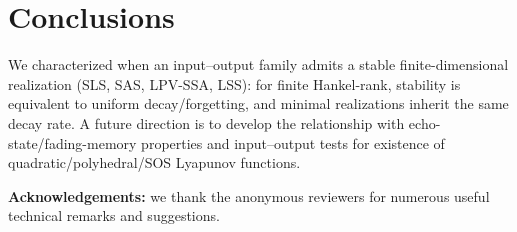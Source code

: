 \documentclass[journal,twoside,web]{ieeecolor}
\newtheorem{corollary}[Theorem]{Corollary}
\begin{document}


\section{Conclusions}
We characterized when an input--output family admits a stable finite-dimensional realization (SLS, SAS, LPV-SSA, LSS): for finite Hankel-rank, stability is equivalent to uniform decay/forgetting, and minimal realizations inherit the same decay rate.
A future direction is to develop the relationship with echo-state/fading-memory properties and input--output tests for existence of quadratic/polyhedral/SOS Lyapunov functions.

\textbf{Acknowledgements:} we thank the anonymous reviewers for numerous useful technical remarks and suggestions. 

 

\end{document}
